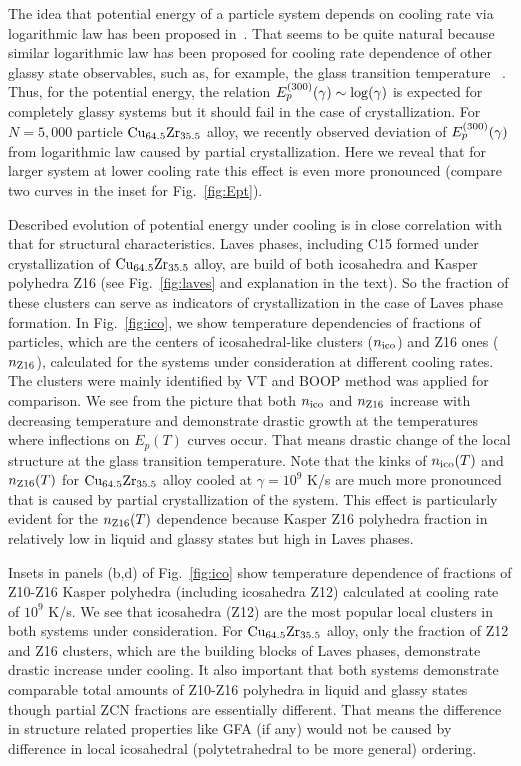 \documentclass[jcp,twocolumn,superscriptaddress,floatfix,graphicx,showpacs]{revtex4-1}
\begin{document}
The idea that potential energy of a particle system depends on cooling rate via logarithmic law has been proposed in~\cite{Zhang2014AppPhysLett,Zhang2015PRB_2}. That seems to be quite natural because similar logarithmic law has been proposed for cooling rate dependence of other glassy state observables, such as, for example, the glass transition temperature ~\cite{Samwer1992PRB}. Thus, for the potential energy, the relation  $E^{\rm(300)}_{p}(\gamma) \sim \log (\gamma)$ is expected for completely glassy systems but it should fail in the case of crystallization. For $N=5,000$ particle ${\rm Cu_{64.5}Zr_{35.5}}$ alloy, we recently observed deviation of $E^{\rm(300)}_{p}(\gamma)$ from logarithmic law caused by partial crystallization\cite{Ryltsev2016JCP}. Here we reveal that for larger system at lower cooling rate this effect is even more pronounced (compare two curves in the inset for Fig.~\ref{fig:Ept}).

Described evolution of potential energy under cooling is in close correlation with that for structural characteristics.  Laves phases, including C15 formed under crystallization of ${\rm Cu_{64.5}Zr_{35.5}}$ alloy, are build of both icosahedra and Kasper polyhedra Z16 (see Fig.~\ref{fig:laves} and explanation in the text). So the fraction of these clusters can serve as indicators of crystallization in the case of Laves phase formation. In Fig.~\ref{fig:ico}, we show temperature dependencies of fractions of particles, which are the centers of icosahedral-like clusters ($n_{\rm ico}$) and Z16 ones ($n_{\rm Z16}$), calculated for the systems under consideration at different cooling rates. The clusters were mainly identified by VT and BOOP method was applied for comparison.  We see from the picture that both $n_{\rm ico}$ and $n_{\rm Z16}$ increase with decreasing temperature and demonstrate drastic growth at the temperatures where inflections on $E_p(T)$ curves occur. That means drastic change of the local structure at the glass transition temperature. Note that the kinks of $n_{\rm ico}(T)$ and $n_{\rm Z16}(T)$ for ${\rm Cu_{64.5}Zr_{35.5}}$ alloy cooled at $\gamma = 10^{9}$ K/s are much more pronounced that is caused by partial crystallization of the system. This effect is particularly evident for the $n_{\rm Z16}(T)$ dependence because Kasper Z16 polyhedra fraction in relatively low in liquid and glassy states but high in Laves phases.

Insets in panels (b,d) of Fig.~\ref{fig:ico} show temperature dependence of fractions of Z10-Z16 Kasper polyhedra (including icosahedra Z12) calculated at cooling rate of $10^{9}$ K/s. We see that icosahedra (Z12) are the most popular local clusters in both systems under consideration. For ${\rm Cu_{64.5}Zr_{35.5}}$ alloy, only the fraction of Z12 and Z16 clusters, which are the building blocks of Laves phases, demonstrate drastic increase under cooling. It also important that both systems demonstrate comparable total amounts of Z10-Z16 polyhedra in liquid and glassy states though partial ZCN fractions are essentially different. That means the difference in structure related properties like GFA (if any) would not be caused by difference in local icosahedral (polytetrahedral to be more general) ordering.
\end{document}
